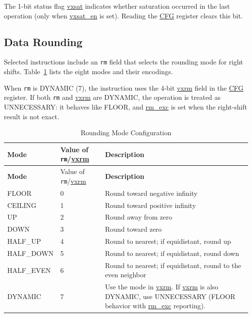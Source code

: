 \documentclass[main\_\_EN.tex]{subfiles}
\begin{document}
The 1-bit status flag \hyperref[vxsat]{vxsat} indicates whether saturation occurred in the last operation (only when \hyperref[vxsat_en]{vxsat\_en} is set). Reading the \hyperref[regdesc:ESPCFG]{CFG} register clears this bit.

\subsection{Data Rounding}

Selected instructions include an \lstinline{rm} field that selects the rounding mode for right shifts. Table~\ref{tab:ESP-rounding-mode-config} lists the eight modes and their encodings.

When \lstinline{rm} is DYNAMIC (7), the instruction uses the 4-bit \hyperref[vxrm]{vxrm} field in the \hyperref[regdesc:ESPCFG]{CFG} register. If both \lstinline{rm} and \hyperref[vxrm]{vxrm} are DYNAMIC, the operation is treated as UNNECESSARY: it behaves like FLOOR, and \hyperref[rm_exc]{rm\_exc} is set when the right-shift result is not exact.

\begin{longtable}[c]{|l|l|m{10cm}|}
    \caption{Rounding Mode Configuration}
    \label{tab:ESP-rounding-mode-config}\\
    \hline
    \rowcolor{lightgray}
    \textbf{Mode} & Value of \texttt{rm}/\hyperref[vxrm]{vxrm} & \textbf{Description} \\\hline
    \endfirsthead
    \rowcolor{lightgray}
    \textbf{Mode} & Value of \texttt{rm}/\hyperref[vxrm]{vxrm} & \textbf{Description} \\\hline
    \endhead
    \endfoot

FLOOR & 0 & Round toward negative infinity \\\hline

CEILING & 1 & Round toward positive infinity \\\hline

UP & 2 & Round away from zero \\\hline

DOWN & 3 & Round toward zero \\\hline

HALF\_UP & 4 & Round to nearest; if equidistant, round up \\\hline

HALF\_DOWN & 5 & Round to nearest; if equidistant, round down \\\hline

HALF\_EVEN & 6 & Round to nearest; if equidistant, round to the even neighbor \\\hline

DYNAMIC & 7 & Use the mode in \hyperref[vxrm]{vxrm}. If \hyperref[vxrm]{vxrm} is also DYNAMIC, use UNNECESSARY (FLOOR behavior with \hyperref[rm_exc]{rm\_exc} reporting). \\\hline

    \end{longtable}
\end{document}

